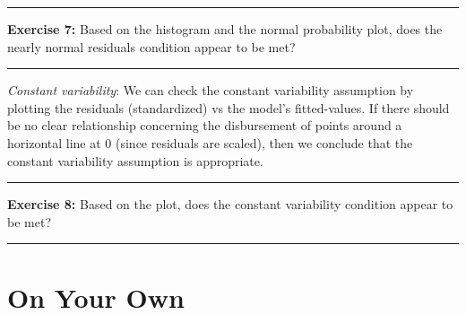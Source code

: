 \documentclass[]{book}
\newenvironment{Shaded}{\begin{snugshade}}{\end{snugshade}}
\newcommand{\KeywordTok}[1]{\textcolor[rgb]{0.13,0.29,0.53}{\textbf{{#1}}}}
\newcommand{\DataTypeTok}[1]{\textcolor[rgb]{0.13,0.29,0.53}{{#1}}}
\newcommand{\DecValTok}[1]{\textcolor[rgb]{0.00,0.00,0.81}{{#1}}}
\newcommand{\StringTok}[1]{\textcolor[rgb]{0.31,0.60,0.02}{{#1}}}
\newcommand{\CommentTok}[1]{\textcolor[rgb]{0.56,0.35,0.01}{\textit{{#1}}}}
\newcommand{\NormalTok}[1]{{#1}}
\theoremstyle{definition}
\theoremstyle{definition}
\theoremstyle{definition}
\theoremstyle{remark}
\begin{document}
\begin{Shaded}
\end{Shaded}

\begin{center}\rule{0.5\linewidth}{\linethickness}\end{center}

\textbf{Exercise 7:} Based on the histogram and the normal probability
plot, does the nearly normal residuals condition appear to be met?

\begin{center}\rule{0.5\linewidth}{\linethickness}\end{center}

\emph{Constant variability}: We can check the constant variability
assumption by plotting the residuals (standardized) vs the model's
fitted-values. If there should be no clear relationship concerning the
disbursement of points around a horizontal line at 0 (since residuals
are scaled), then we conclude that the constant variability assumption
is appropriate.

\begin{Shaded}
\end{Shaded}

\begin{center}\rule{0.5\linewidth}{\linethickness}\end{center}

\textbf{Exercise 8:} Based on the plot, does the constant variability
condition appear to be met?

\begin{center}\rule{0.5\linewidth}{\linethickness}\end{center}

\section{On Your Own}\label{on-your-own-7}
\end{document}
